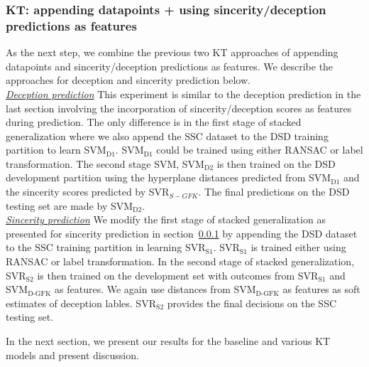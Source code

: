 \documentclass{article}
\begin{document}
\subsubsection{KT: appending datapoints + using sincerity/deception predictions as features}
As the next step, we combine the previous two KT approaches of appending datapoints and sincerity/deception predictions as features.
We describe the approaches for deception and sincerity prediction below.
\\

\noindent\underline{\it Deception prediction} This experiment is similar to the deception prediction in the last section involving the incorporation of sincerity/deception scores as features during prediction.
The only difference is in the first stage of stacked generalization where we also append the SSC dataset to the DSD training partition to learn SVM$_\text{D1}$. 
SVM$_\text{D1}$ could be trained using either RANSAC or label transformation.
The second stage SVM, SVM$_\text{D2}$ is then trained on the DSD development partition using the hyperplane distances predicted from SVM$_\text{D1}$ and the sincerity scores predicted by SVR$_{S-GFK}$. 
The final predictions on the DSD testing set are made by SVM$_\text{D2}$.
\\

\noindent\underline{\it Sincerity prediction}
We modify the first stage of stacked generalization as presented for sincerity prediction in section~\ref{} by appending the DSD dataset to the SSC training partition in learning SVR$_\text{S1}$.
SVR$_\text{S1}$ is trained either using RANSAC or label transformation. 
In the second stage of stacked generalization, SVR$_\text{S2}$ is then trained on the development set with outcomes from SVR$_\text{S1}$ and SVM$_\text{D-GFK}$ as features.
We again use distances from SVM$_\text{D-GFK}$ as features as soft estimates of deception lables. 
SVR$_\text{S2}$ provides the final decisions on the SSC testing set.

In the next section, we present our results for the baseline and various KT models and present discussion.
\end{document}
